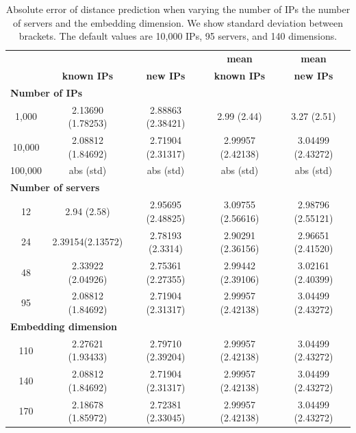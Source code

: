 \begin{table}

		\begin{tabular}{c|c|c|c|c}
			& \textbf{\system{}} & \textbf{\system{}}& \textbf{mean} & \textbf{mean}\\
			& \textbf{known IPs} & \textbf{new IPs}& \textbf{known IPs} & \textbf{new IPs}\\
			\hline
			\multicolumn{5}{l}{\bf Number of IPs}\\
			\hline
			1,000 & 2.13690 (1.78253) & 2.88863 (2.38421) & 2.99 (2.44) & 3.27 (2.51) \\
			10,000 & 2.08812 (1.84692) & 2.71904 (2.31317) & 2.99957 (2.42138) & 3.04499 (2.43272) \\
			100,000 & abs (std) & abs (std) & abs (std) & abs (std) \\
			\hline
			\multicolumn{5}{l}{\bf Number of servers} \\
			\hline
			12 & 2.94 (2.58) & 2.95695 (2.48825) & 3.09755 (2.56616) & 2.98796 (2.55121) \\
			24 & 2.39154(2.13572) & 2.78193 (2.3314) & 2.90291 (2.36156) & 2.96651 (2.41520) \\
			48 & 2.33922 (2.04926) & 2.75361 (2.27355) & 2.99442 (2.39106) & 3.02161 (2.40399) \\
			95 & 2.08812 (1.84692) & 2.71904 (2.31317) & 2.99957 (2.42138) & 3.04499 (2.43272) \\
			\hline
			\multicolumn{5}{l}{\bf Embedding dimension} \\
			\hline
			110 & 2.27621 (1.93433) & 2.79710 (2.39204) & 2.99957 (2.42138) & 3.04499 (2.43272) \\
			140 & 2.08812 (1.84692) & 2.71904 (2.31317) & 2.99957 (2.42138) & 3.04499 (2.43272) \\
			170 & 2.18678 (1.85972) & 2.72381 (2.33045) & 2.99957 (2.42138) & 3.04499 (2.43272) \\
	\end{tabular}
	\caption{Absolute error of distance prediction when varying the number of IPs the number of servers and the embedding dimension. We show standard deviation between brackets. The default values are 10,000 IPs, 95 servers, and 140 dimensions.}
	\label{tab:abserror}
\end{table}
\fi

